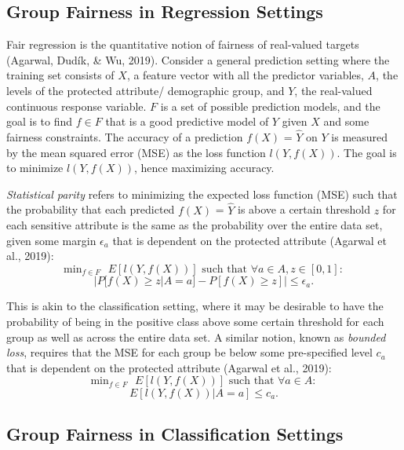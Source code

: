 \documentclass[12pt, twoside]{amherstthesis}
\begin{document}
\hypertarget{group-fairness-in-regression-settings}{%
\subsection{Group Fairness in Regression Settings}\label{group-fairness-in-regression-settings}}

Fair regression is the quantitative notion of fairness of real-valued targets (Agarwal, Dudík, \& Wu, 2019). Consider a general prediction setting where the training set consists of \(X\), a feature vector with all the predictor variables, \(A\), the levels of the protected attribute/ demographic group, and \(Y\), the real-valued continuous response variable. \(F\) is a set of possible prediction models, and the goal is to find \(f \in F\) that is a good predictive model of \(Y\) given \(X\) and some fairness constraints. The accuracy of a prediction \(f(X)\) = \(\hat{Y}\) on \(Y\) is measured by the mean squared error (MSE) as the loss function \(l(Y, f(X))\). The goal is to minimize \(l(Y, f(X))\), hence maximizing accuracy.

\emph{Statistical parity} refers to minimizing the expected loss function (MSE) such that the probability that each predicted \(f(X)\) = \(\hat{Y}\) is above a certain threshold \(z\) for each sensitive attribute is the same as the probability over the entire data set, given some margin \(\epsilon_a\) that is dependent on the protected attribute (Agarwal et al., 2019):
\begin{equation}
\label{ch1eq1}
\text{min}_{f \in F} \text{ } E[l(Y, f(X))] \text{ such that } \forall a \in A, z \in [0,1]:
\end{equation}
\[ |P[f(X) \geq z | A = a] - P[f(X) \geq z]| \leq \epsilon_a.\]

This is akin to the classification setting, where it may be desirable to have the probability of being in the positive class above some certain threshold for each group as well as across the entire data set. A similar notion, known as \emph{bounded loss}, requires that the MSE for each group be below some pre-specified level \(c_a\) that is dependent on the protected attribute (Agarwal et al., 2019):
\begin{equation}
\label{ch1eq2}
\text{min}_{f \in F} \text{ } E[l(Y, f(X))] \text{ such that } \forall a \in A: 
\end{equation}
\[ E[l(Y, f(X)) | A = a] \leq c_a.\]

\hypertarget{classfairdef}{%
\subsection{Group Fairness in Classification Settings}\label{classfairdef}}
\end{document}
